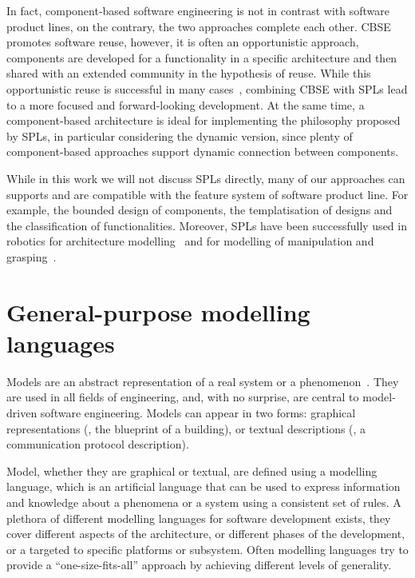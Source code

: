 In fact, component-based software engineering is not in contrast with software product lines, on the contrary, the two approaches complete each other. CBSE promotes software reuse, however, it is often an opportunistic approach, components are developed for a functionality in a specific architecture and then shared with an extended community in the hypothesis of reuse. While this opportunistic reuse is successful in many cases~\cite{jansen2008pragmatic}, combining CBSE with SPLs lead to a more focused and forward-looking development. At the same time, a component-based architecture is ideal for implementing the philosophy proposed by SPLs, in particular considering the dynamic version, since plenty of component-based approaches support dynamic connection between components.

While in this work we will not discuss SPLs directly, many of our approaches can supports and are compatible with the feature system of software product line. For example, the bounded design of components, the templatisation of designs and the classification of functionalities. Moreover, SPLs have been successfully used in robotics for architecture modelling~\cite{gherardi2014modeling, brugali2016hyperflex} and for modelling of manipulation and grasping~\cite{baumgartl2013towards}.
 
\section[General-purpose modelling languages]{General-purpose modelling\\languages}
Models are an abstract representation of a real system or a phenomenon~\cite{schichl2004models}. They are used in all fields of engineering, and, with no surprise, are central to model-driven software engineering. Models can appear in two forms: graphical representations (\eg, the blueprint of a building), or textual descriptions (\eg, a communication protocol description). 

Model, whether they are graphical or textual, are defined using a modelling language, which is an artificial language that can be used to express information and knowledge about a phenomena or a system using a consistent set of rules. A plethora of different modelling languages for software development exists, they cover different aspects of the architecture, or different phases of the development, or a targeted to specific platforms or subsystem. Often modelling languages try to provide a ``one-size-fits-all'' approach by achieving different levels of generality.

